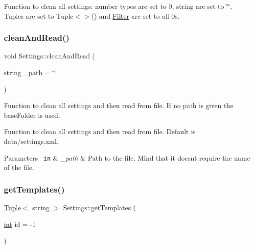 Function to clean all settings\+: number types are set to 0, string are set to \char`\"{}\char`\"{}, Tuples are set to Tuple$<$$>$() and \mbox{\hyperlink{class_filter}{Filter}} are set to all 0s. 

\mbox{\label{class_settings_acd13c0d603d94c7c2da58cd92bc955c8}} 
\subsubsection{\texorpdfstring{cleanAndRead()}{cleanAndRead()}}
{\footnotesize\ttfamily void Settings\+::clean\+And\+Read (\begin{DoxyParamCaption}\item[{string}]{\+\_\+path = {\ttfamily \char`\"{}\char`\"{}} }\end{DoxyParamCaption})}



Function to clean all settings and then read from file. If no path is given the base\+Folder is used. 

Function to clean all settings and then read from file. Default is data/settings.\+xml.


\begin{DoxyParams}[1]{Parameters}
\mbox{\texttt{ in}}  & {\em \+\_\+path} & Path to the file. Mind that it doesn\textquotesingle{}t require the name of the file.\\
\hline
\end{DoxyParams}
\mbox{\label{class_settings_af68cb84ba3c8d21e004661fee7c0efe7}} 
\subsubsection{\texorpdfstring{getTemplates()}{getTemplates()}\hspace{0.1cm}{\footnotesize\ttfamily [1/3]}}
{\footnotesize\ttfamily \mbox{\hyperlink{class_tuple}{Tuple}}$<$ string $>$ Settings\+::get\+Templates (\begin{DoxyParamCaption}\item[{\mbox{\hyperlink{draw_8hh_aa620a13339ac3a1177c86edc549fda9b}{int}}}]{id = {\ttfamily -\/1} }\end{DoxyParamCaption})}



